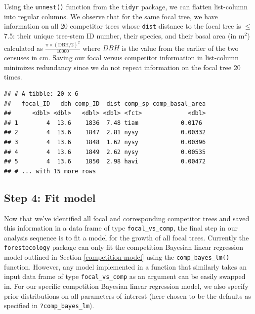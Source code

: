 \documentclass[12pt]{article}
\newenvironment{Shaded}{\begin{snugshade}}{\end{snugshade}}
\newcommand{\DataTypeTok}[1]{\textcolor[rgb]{0.13,0.29,0.53}{#1}}
\newcommand{\DecValTok}[1]{\textcolor[rgb]{0.00,0.00,0.81}{#1}}
\newcommand{\KeywordTok}[1]{\textcolor[rgb]{0.13,0.29,0.53}{\textbf{#1}}}
\newcommand{\NormalTok}[1]{#1}
\newcommand{\OperatorTok}[1]{\textcolor[rgb]{0.81,0.36,0.00}{\textbf{#1}}}
\newcommand{\StringTok}[1]{\textcolor[rgb]{0.31,0.60,0.02}{#1}}
\begin{document}
Using the \texttt{unnest()} function from the \texttt{tidyr} package, we
can flatten list-column into regular columns. We observe that for the
same focal tree, we have information on all 20 competitor trees whose
\texttt{dist} distance to the focal tree is \(\leq\) 7.5: their unique
tree-stem ID number, their species, and their basal area (in m\(^2\))
calculated as \(\frac{\pi \times (\text{DBH/2})^2}{10000}\) where
\(DBH\) is the value from the earlier of the two censuses in cm. Saving
our focal versus competitor information in list-column minimizes
redundancy since we do not repeat information on the focal tree 20
times.

\begin{Shaded}
\end{Shaded}

\begin{verbatim}
## # A tibble: 20 x 6
##   focal_ID   dbh comp_ID  dist comp_sp comp_basal_area
##      <dbl> <dbl>   <dbl> <dbl> <fct>             <dbl>
## 1        4  13.6    1836  7.48 tiam            0.0176 
## 2        4  13.6    1847  2.81 nysy            0.00332
## 3        4  13.6    1848  1.62 nysy            0.00396
## 4        4  13.6    1849  2.62 nysy            0.00535
## 5        4  13.6    1850  2.98 havi            0.00472
## # ... with 15 more rows
\end{verbatim}

\hypertarget{model-fit-predict}{%
\subsection{Step 4: Fit model}\label{model-fit-predict}}

Now that we've identified all focal and corresponding competitor trees
and saved this information in a data frame of type
\texttt{focal\_vs\_comp}, the final step in our analysis sequence is to
fit a model for the growth of all focal trees. Currently the
\texttt{forestecology} package can only fit the competition Bayesian
linear regression model outlined in Section \ref{competition-model}
using the \texttt{comp\_bayes\_lm()} function. However, any model
implemented in a function that similarly takes an input data frame of
type \texttt{focal\_vs\_comp} as an argument can be easily swapped in.
For our specific competition Bayesian linear regression model, we also
specify prior distributions on all parameters of interest (here chosen
to be the defaults as specified in \texttt{?comp\_bayes\_lm}).
\end{document}
